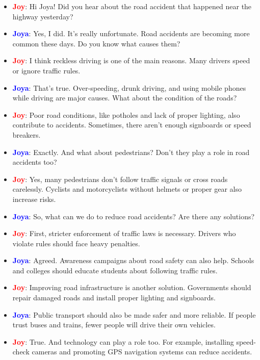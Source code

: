 \documentclass{article}
\begin{document}
\begin{itemize}
    \item \textbf{\textcolor{red}{Joy}}: Hi Joya! Did you hear about the road accident that happened near the highway yesterday?
    \item \textbf{\textcolor{blue}{Joya}}: Yes, I did. It’s really unfortunate. Road accidents are becoming more common these days. Do you know what causes them?
    \item \textbf{\textcolor{red}{Joy}}: I think reckless driving is one of the main reasons. Many drivers speed or ignore traffic rules.
    \item \textbf{\textcolor{blue}{Joya}}: That’s true. Over-speeding, drunk driving, and using mobile phones while driving are major causes. What about the condition of the roads?
    \item \textbf{\textcolor{red}{Joy}}: Poor road conditions, like potholes and lack of proper lighting, also contribute to accidents. Sometimes, there aren’t enough signboards or speed breakers.
    \item \textbf{\textcolor{blue}{Joya}}: Exactly. And what about pedestrians? Don’t they play a role in road accidents too?
    \item \textbf{\textcolor{red}{Joy}}: Yes, many pedestrians don’t follow traffic signals or cross roads carelessly. Cyclists and motorcyclists without helmets or proper gear also increase risks.
    \item \textbf{\textcolor{blue}{Joya}}: So, what can we do to reduce road accidents? Are there any solutions?
    \item \textbf{\textcolor{red}{Joy}}: First, stricter enforcement of traffic laws is necessary. Drivers who violate rules should face heavy penalties.
    \item \textbf{\textcolor{blue}{Joya}}: Agreed. Awareness campaigns about road safety can also help. Schools and colleges should educate students about following traffic rules.
    \item \textbf{\textcolor{red}{Joy}}: Improving road infrastructure is another solution. Governments should repair damaged roads and install proper lighting and signboards.
    \item \textbf{\textcolor{blue}{Joya}}: Public transport should also be made safer and more reliable. If people trust buses and trains, fewer people will drive their own vehicles.
    \item \textbf{\textcolor{red}{Joy}}: True. And technology can play a role too. For example, installing speed-check cameras and promoting GPS navigation systems can reduce accidents.

\end{itemize}
\end{document}
